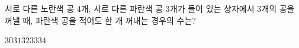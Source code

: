 \hspace*{2mm}\begin{minipage}[t]{\dimexpr\linewidth-2mm\relax}\vspace{0pt}
서로 다른 노란색 공 4개, 서로 다른 파란색 공 3개가 들어 있는 상자에서 3개의 공을 꺼낼 때, 파란색 공을 적어도 한 개 꺼내는 경우의 수는?
\begin{choices32}{$30$}{$31$}{$32$}{$33$}{$34$}\end{choices32}\end{minipage}
